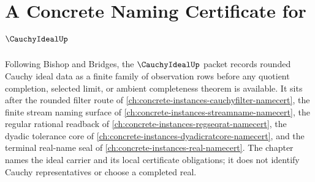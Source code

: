 \chapter{A Concrete Naming Certificate for $\CauchyIdealUp$}
\label{ch:concrete-instances-cauchy-ideal-namecert}

Following Bishop and Bridges, the $\CauchyIdealUp$ packet records rounded Cauchy ideal data as a finite family of observation rows before any quotient completion, selected limit, or ambient completeness theorem is available. It sits after the rounded filter route of \autoref{ch:concrete-instances-cauchyfilter-namecert}, the finite stream naming surface of \autoref{ch:concrete-instances-streamname-namecert}, the regular rational readback of \autoref{ch:concrete-instances-regseqrat-namecert}, the dyadic tolerance core of \autoref{ch:concrete-instances-dyadicratcore-namecert}, and the terminal real-name seal of \autoref{ch:concrete-instances-real-namecert}. The chapter names the ideal carrier and its local certificate obligations; it does not identify Cauchy representatives or choose a completed real.

